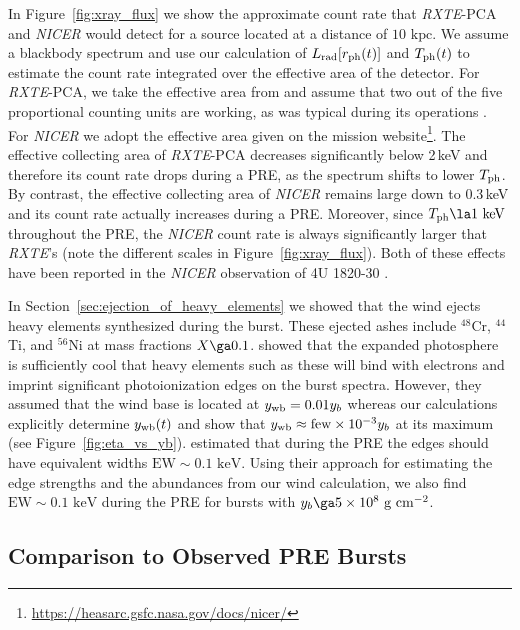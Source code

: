 \documentclass[apj,usenatbib, iop, twocolappendix]{emulateapj}
\newcommand{\Lrad}{L_{\rm rad}}
\newcommand{\trm}[1]{\textrm{#1}}
\begin{document}
In Figure~\ref{fig:xray_flux} we show the approximate count rate that {\it RXTE}-PCA and {\it NICER} would detect for a source located at a distance of $10\trm{ kpc}$.  We assume a blackbody spectrum and use our calculation of $\Lrad[r_{\rm ph}(t)]$ and $T_{\rm ph}(t)$ to estimate the count rate integrated over the effective area of the detector. For {\it RXTE}-PCA, we take the effective area from \cite{Jahoda:06} and assume that two out of the five proportional counting units are working, as was  typical during its operations .
For {\it NICER} we adopt the effective area given on the mission website\footnote{\url{https://heasarc.gsfc.nasa.gov/docs/nicer/}}. The effective collecting area of {\it RXTE}-PCA decreases significantly below 2\,keV and therefore its count rate drops during a PRE, as the spectrum shifts to lower $T_{\rm ph}$. By contrast, the effective collecting area of {\it NICER} remains large down to 0.3\,keV and its count rate actually increases during a PRE.  Moreover, since $T_{\rm ph}\la 1\trm{ keV}$ throughout the PRE, the {\it NICER} count rate is always significantly larger that {\it RXTE}'s (note the different scales in Figure~\ref{fig:xray_flux}).  Both of these effects have been reported in the {\it NICER} observation of 4U 1820-30 \citep{Keek:18}.

In Section~\ref{sec:ejection_of_heavy_elements} we showed that the wind ejects heavy elements synthesized during the burst.  These ejected ashes include $^{48}$Cr, $^{44}$Ti, and $^{56}$Ni at mass fractions $X\ga 0.1$.   showed that the expanded photosphere is sufficiently cool that heavy elements such as these will bind with electrons and imprint significant photoionization edges on the burst spectra.  However, they assumed that the wind base is located at $y_{\rm wb}= 0.01 y_b$ whereas our calculations explicitly determine $y_{\rm wb}(t)$ and show that $y_{\rm wb}\approx \trm{few}\times 10^{-3}y_b$ at its maximum (see Figure~\ref{fig:eta_vs_yb}).   estimated that during the PRE the edges should have equivalent widths $\trm{EW}\sim 0.1\trm{ keV}$.  Using their approach for estimating the edge strengths and the abundances from our wind calculation, we also find $\trm{EW}\sim 0.1\trm{ keV}$ during the PRE for bursts with $y_b\ga 5\times10^8\trm{ g cm}^{-2}$.  


\subsection{Comparison to Observed PRE Bursts}
\label{sec:comp_pre}
\end{document}

